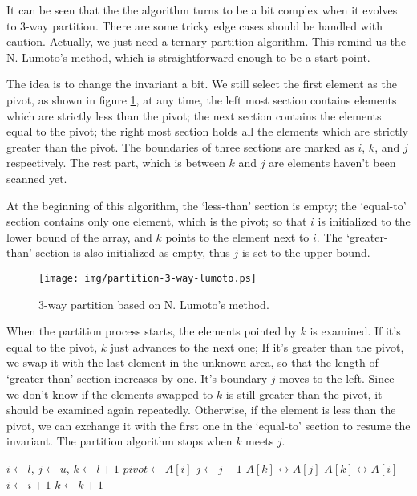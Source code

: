 \documentclass[UTF8]{article}
\begin{document}
It can be seen that the the algorithm turns to be a bit complex when it evolves to 3-way partition.
There are some tricky edge cases should be handled with caution. Actually, we just need a ternary
partition algorithm. This remind us the N. Lumoto's method, which is straightforward enough
to be a start point.

The idea is to change the invariant a bit. We still select the first element as the pivot,
as shown in figure \ref{fig:partition-3-way-lumoto},
at any time, the left most section contains elements which are strictly less than the pivot;
the next section contains the elements equal to the pivot; the right most section holds all the
elements which are strictly greater than the pivot. The boundaries of three sections are marked
as $i$, $k$, and $j$ respectively.
The rest part, which is between $k$ and $j$ are elements haven't been scanned yet.

At the beginning of this algorithm, the `less-than' section is empty; the `equal-to' section
contains only one element, which is the pivot; so that $i$ is initialized to the lower bound
of the array, and $k$ points to the element next to $i$. The `greater-than' section is also
initialized as empty, thus $j$ is set to the upper bound.

\begin{figure}[htbp]
   \centering
   \texttt{[image: img/partition-3-way-lumoto.ps]}
   \caption{3-way partition based on N. Lumoto's method.}
   \label{fig:partition-3-way-lumoto}
\end{figure}

When the partition process starts, the elements pointed by $k$ is examined. If it's equal to
the pivot, $k$ just advances to the next one; If it's greater than the pivot, we swap it with
the last element in the unknown area, so that the length of `greater-than' section increases
by one. It's boundary $j$ moves to the left. Since we don't know if the elements swapped to $k$
is still greater than the pivot, it should be examined again repeatedly. Otherwise, if the
element is less than the pivot, we can exchange it with the first one in the `equal-to' section
to resume the invariant. The partition algorithm stops when $k$ meets $j$.

\begin{algorithmic}[1]
    \State $i \gets l$, $j \gets u$, $k \gets l + 1$
    \State $pivot \gets A[i]$
        \State $j \gets j - 1$
        \State {} $A[k] \leftrightarrow A[j]$
      \EndWhile
        \State {} $A[k] \leftrightarrow A[i]$
        \State $i \gets i + 1$
      \EndIf
      \State $k \gets k + 1$
    \EndWhile
    \State {}
    \State {}
  \EndIf
\EndProcedure
\end{algorithmic}
\end{document}
